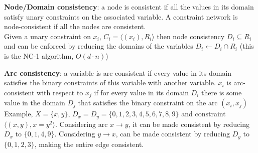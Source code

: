 \documentclass[10pt]{report}
\begin{document}
\begin{list}{}{} 
	\item \textbf{Node/Domain consistency}: a node is consistent if all the values in its domain satisfy unary constraints on the associated variable. A constraint network is node-consistent if all the nodes are consistent.\\
	Given a unary constraint on $x_i$, $C_i = \langle(x_i), R_i\rangle$ then node consistency $D_i \subseteq R_i$ and can be enforced by reducing the domains of the variables $D_i \leftarrow D_i \cap R_i$ (this is the NC-1 algorithm, $O(d\cdot n)$)
	\item \textbf{Arc consistency}: a variable is arc-consistent if every value in its domain satisfies the binary constraints of this variable with another variable. $x_i$ is arc-consistent with respect to $x_j$ if for every value in its domain $D_i$ there is some value in the domain $D_j$ that satisfies the binary constraint on the arc $(x_i, x_j)$\\
	Example, $X = \{x, y\}$, $D_x = D_y = \{0,1,2,3,4,5,6,7,8,9\}$ and constraint $\langle(x,y), x=y^2\rangle$. Considering arc $x \rightarrow y$, it can be made consistent by reducing $D_x$ to $\{0,1,4,9\}$. Considering $y \rightarrow x$, can be made consistent by reducing $D_y$ to $\{0,1,2,3\}$, making the entire edge consistent.
\end{list}
\end{document}
